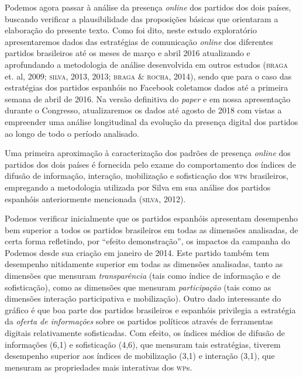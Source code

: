 Podemos agora passar à análise da presença \emph{online} dos partidos dos dois
países, buscando verificar a plausibilidade das proposições básicas que
orientaram a elaboração do presente texto. Como foi dito, neste estudo
exploratório apresentaremos dados das estratégias de comunicação \emph{online}
dos diferentes partidos brasileiros até os meses de março e abril 2016
atualizando e aprofundando a metodologia de análise desenvolvida em
outros estudos (\textsc{braga} et. al, 2009; \textsc{silva}, 2013, 2013; \textsc{braga \& rocha},
2014), sendo que para o caso das estratégias dos partidos espanhóis no
Facebook coletamos dados até a primeira semana de abril de 2016. Na
versão definitiva do \textit{paper} e em nossa apresentação durante o Congresso,
atualizaremos os dados até agosto de 2018 com vistas a empreender uma
análise longitudinal da evolução da presença digital dos partidos ao
longo de todo o período analisado.

Uma primeira aproximação à caracterização dos padrões de presença \emph{online}
dos partidos dos dois países é fornecida pelo exame do
comportamento dos índices de difusão de
informação, interação, mobilização e sofisticação dos \textsc{wp}s brasileiros,
empregando a metodologia utilizada por Silva em sua análise dos partidos
espanhóis anteriormente mencionada (\textsc{silva}, 2012).

Podemos verificar inicialmente que os partidos espanhóis apresentam
desempenho bem superior a todos os partidos brasileiros em todas as
dimensões analisadas, de certa forma refletindo, por ``efeito
demonstração'', os impactos da campanha do Podemos desde sua
criação em janeiro de 2014. Este partido também tem desempenho
nitidamente superior em todas as dimensões analisadas, tanto as
dimensões que mensuram \emph{transparência} (tais como índice de
informação e de sofisticação), como as dimensões que mensuram
\emph{participação} (tais como as dimensões interação participativa e
mobilização). Outro dado interessante do gráfico é que boa parte dos
partidos brasileiros e espanhóis privilegia a estratégia da \emph{oferta
de informações} sobre os partidos políticos através de ferramentas
digitais relativamente sofisticadas. Com efeito, os índices médios de
difusão de informações (6,1) e sofisticação (4,6), que mensuram tais
estratégias, tiverem desempenho superior aos índices de mobilização
(3,1) e interação (3,1), que mensuram as propriedades mais interativas
dos \textsc{wp}s.

